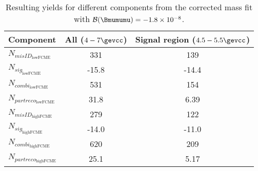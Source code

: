\begin{table}[H]
\begin{center}
\begin{tabular}{ l  c  c }
\toprule
Component &  All ($4-7 \gevcc$) & Signal region ($4.5-5.5\gevcc$)  \\
\hline
$N_{misID_{\mathrm{lowFCME}}}$  &  331 & 139 \\
$N_{sig_{\mathrm{lowFCME}}}$  & -15.8  & -14.4 \\
$N_{combi_{\mathrm{lowFCME}}}$  & 531 & 154 \\
$N_{partreco_{\mathrm{lowFCME}}}$  & 31.8 & 6.39 \\
\hline
$N_{misID_{\mathrm{highFCME}}}$  &  279 & 122 \\
$N_{sig_{\mathrm{highFCME}}}$  &-14.0 & -11.0  \\
$N_{combi_{\mathrm{highFCME}}}$  & 620 & 209 \\
$N_{partreco_{\mathrm{highFCME}}}$ & 25.1 & 5.17 \\
\bottomrule
\end{tabular}
\end{center}
	\caption{Resulting yields for different components from the corrected mass fit with $\mathcal{B}(\Bmumumu) =-1.8\times 10^{-8}$.}
\label{tab:yieldiatkos}
\end{table}



